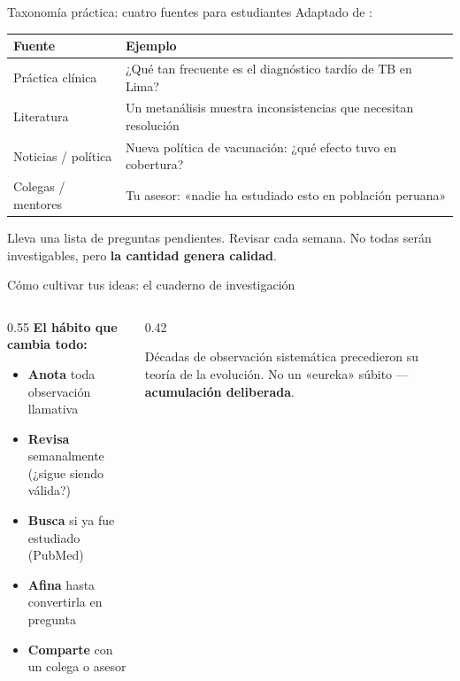 \documentclass[12pt, aspectratio=169]{beamer}
\begin{document}
\begin{frame}{Taxonomía práctica: cuatro fuentes para estudiantes}
  Adaptado de \textcite{Hulley2013_designing}:

  \smallskip
  \begin{tabular}{@{}p{} p{}@{}}
    \toprule
    \textbf{Fuente} & \textbf{Ejemplo} \\
    \midrule
    Práctica clínica & ¿Qué tan frecuente es el diagnóstico tardío de TB en Lima? \\[1pt]
    Literatura & Un metanálisis muestra inconsistencias que necesitan resolución \\[1pt]
    Noticias / política & Nueva política de vacunación: ¿qué efecto tuvo en cobertura? \\[1pt]
    Colegas / mentores & Tu asesor: «nadie ha estudiado esto en población peruana» \\
    \bottomrule
  \end{tabular}

  \smallskip
  \begin{examplebox}
    \small
    Lleva una lista de preguntas pendientes. Revisar cada semana.
    No todas serán investigables, pero \textbf{la cantidad genera calidad}.
  \end{examplebox}
\end{frame}

\begin{frame}{Cómo cultivar tus ideas: el cuaderno de investigación}
  \begin{columns}[T]
    \begin{column}{0.55\textwidth}
      \textbf{El hábito que cambia todo:}
      \begin{itemize}
        \item \textbf{Anota} toda observación llamativa
        \item \textbf{Revisa} semanalmente (¿sigue siendo válida?)
        \item \textbf{Busca} si ya fue estudiado (PubMed)
        \item \textbf{Afina} hasta convertirla en pregunta
        \item \textbf{Comparte} con un colega o asesor
      \end{itemize}
    \end{column}
    \begin{column}{0.42\textwidth}
      \begin{keybox}
        \footnotesize
        Décadas de observación sistemática precedieron su
        teoría de la evolución. No un «eureka» súbito —
        \textbf{acumulación deliberada}.
      \end{keybox}
    \end{column}
  \end{columns}
\end{frame}
\end{document}
